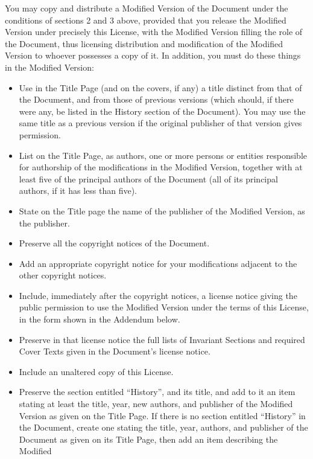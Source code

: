 \documentclass[a4paper,11pt,twoside,dvips]{report}
\begin{document}
You may copy and distribute a Modified Version of the Document under
the conditions of sections 2 and 3 above, provided that you release
the Modified Version under precisely this License, with the Modified
Version filling the role of the Document, thus licensing distribution
and modification of the Modified Version to whoever possesses a copy
of it.  In addition, you must do these things in the Modified Version:

\begin{itemize}

\item Use in the Title Page (and on the covers, if any) a title distinct
   from that of the Document, and from those of previous versions
   (which should, if there were any, be listed in the History section
   of the Document).  You may use the same title as a previous version
   if the original publisher of that version gives permission.
\item List on the Title Page, as authors, one or more persons or entities
   responsible for authorship of the modifications in the Modified
   Version, together with at least five of the principal authors of the
   Document (all of its principal authors, if it has less than five).
\item State on the Title page the name of the publisher of the
   Modified Version, as the publisher.
\item Preserve all the copyright notices of the Document.
\item Add an appropriate copyright notice for your modifications
   adjacent to the other copyright notices.
\item Include, immediately after the copyright notices, a license notice
   giving the public permission to use the Modified Version under the
   terms of this License, in the form shown in the Addendum below.
\item Preserve in that license notice the full lists of Invariant Sections
   and required Cover Texts given in the Document's license notice.
\item Include an unaltered copy of this License.
\item Preserve the section entitled ``History'', and its title, and add to
   it an item stating at least the title, year, new authors, and
   publisher of the Modified Version as given on the Title Page.  If
   there is no section entitled ``History'' in the Document, create one
   stating the title, year, authors, and publisher of the Document as
   given on its Title Page, then add an item describing the Modified

\end{itemize}
\end{document}

